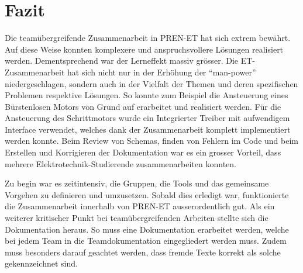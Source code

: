\ifSTANDALONE
\section{Fazit}
\fi
    Die teamübergreifende Zusammenarbeit in PREN-ET hat sich extrem bewährt. 
    Auf diese Weise konnten komplexere und anspruchsvollere Lösungen 
    realisiert werden. Dementsprechend war der Lerneffekt massiv grösser. Die 
    ET-Zusammenarbeit hat sich nicht nur in der Erhöhung der 
    \enquote{man-power} niedergeschlagen, sondern auch in der Vielfalt der 
    Themen und deren spezifischen Problemen respektive Lösungen. So konnte zum 
    Beispiel die Ansteuerung eines Bürstenlosen Motors von Grund auf 
    erarbeitet und realisiert werden. Für die Ansteuerung des Schrittmotors 
    wurde ein Integrierter Treiber mit aufwendigem Interface verwendet, 
    welches dank der Zusammenarbeit komplett implementiert werden konnte. Beim 
    Review von Schemas, finden von Fehlern im Code und beim Erstellen und 
    Korrigieren der Dokumentation war es ein grosser Vorteil, dass mehrere 
    Elektrotechnik-Studierende zusammenarbeiten konnten.\ifSTANDALONE
    
    \noindent
    \fi
    Zu begin war es zeitintensiv, die Gruppen, die Tools und das gemeinsame 
    Vorgehen zu definieren und umzusetzen. Sobald dies erledigt war, 
    funktionierte die Zusammenarbeit innerhalb von PREN-ET ausserordentlich 
    gut. Als ein weiterer kritischer Punkt bei teamübergreifenden Arbeiten 
    stellte sich die Dokumentation heraus. So muss eine Dokumentation 
    erarbeitet werden, welche bei jedem Team in die Teamdokumentation 
    eingegliedert werden muss. Zudem muss besonders darauf geachtet werden, 
    dass fremde Texte korrekt als solche gekennzeichnet sind. 
